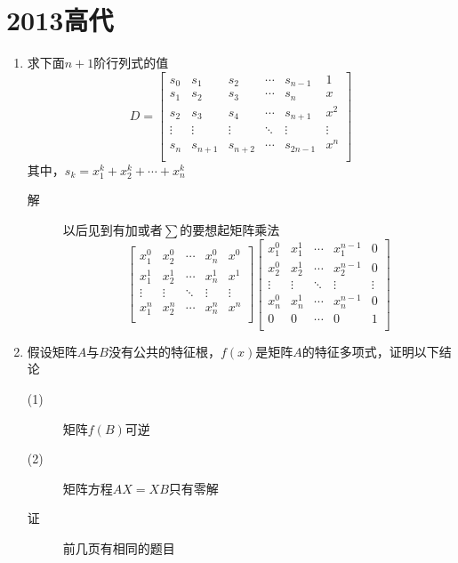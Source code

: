 \section{2013高代}
\begin{enumerate}
\item 求下面$n+1$阶行列式的值
\[
D=\left[
\begin{array}{cccccc}
s_0 & s_1 & s_2 & \cdots & s_{n-1} & 1 \\
s_1 & s_2 & s_3 & \cdots & s_n & x \\
s_2 & s_3 & s_4 & \cdots & s_{n+1} & x^2 \\
\vdots & \vdots & \vdots & \ddots & \vdots & \vdots \\
s_n & s_{n+1} & s_{n+2} & \cdots & s_{2n-1} & x^n \\
\end{array}\right]
\]
其中，$s_k=x_1^k+x_2^k+\cdots+x_n^k$
\begin{description}
\item[解] 以后见到有加或者$\sum$的要想起矩阵乘法
\[
\left[
\begin{array}{ccccc}
x_1^0 & x_2^0 & \cdots & x_n^0 & x^0 \\
x_1^1 & x_2^1 & \cdots & x_n^1 & x^1 \\
\vdots & \vdots & \ddots & \vdots & \vdots \\
x_1^n & x_2^n & \cdots & x_n^n & x^n \\
\end{array}\right]
\left[
\begin{array}{ccccc}
x_1^0 & x_1^1 & \cdots & x_1^{n-1} & 0 \\
x_2^0 & x_2^1 & \cdots & x_2^{n-1} & 0 \\
\vdots & \vdots & \ddots & \vdots & \vdots \\
x_n^0 & x_n^1 & \cdots & x_n^{n-1} & 0 \\
0 & 0 & \cdots & 0 & 1 \\
\end{array}\right]
\]
\end{description}

\item 假设矩阵$A$与$B$没有公共的特征根，$f(x)$是矩阵$A$的特征多项式，证明以下结论
\begin{description}
\item[(1)] 矩阵$f(B)$可逆
\item[(2)] 矩阵方程$AX=XB$只有零解
\item[证] 前几页有相同的题目
\end{description}


\end{enumerate}
